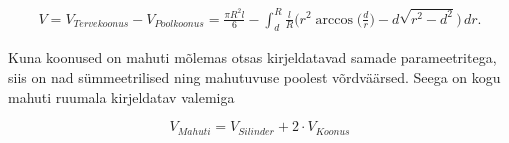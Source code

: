 \documentclass[a4paper]{article}
\begin{document}
\begin{equation}
\begin{aligned}
V = V_{Terve koonus} - V_{Poolkoonus} = 
\frac{\pi R^2 l}{6} -  \int_{d}^{R} \frac{l}{R} \bigg( r^2 \arccos\bigg( \frac{d}{r} \bigg) - d \sqrt{r^2 - d^2} \bigg)\,dr.
\end{aligned}
\end{equation}

\begin{flushleft}
Kuna koonused on mahuti mõlemas otsas kirjeldatavad samade parameetritega, siis on nad sümmeetrilised ning mahutuvuse poolest võrdväärsed. Seega on kogu mahuti ruumala kirjeldatav valemiga
\end{flushleft}

\begin{equation}
V_{Mahuti} = V_{Silinder} + 2 \cdot V_{Koonus} 
\end{equation}



\end{document}
